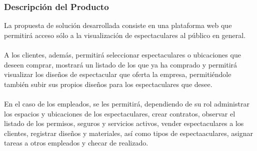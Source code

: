 \subsubsection{Descripción del Producto}
La propuesta de solución desarrollada consiste en una plataforma web que permitirá acceso sólo a la visualización de espectaculares al público en general.\\ \\
A los clientes, además, permitirá seleccionar espectaculares o ubicaciones que deseen comprar, mostrará un listado de los que ya ha comprado y permitirá visualizar los diseños de espectacular que oferta la empresa, permitiéndole también subir sus propios diseños para los espectaculares que desee.\\ \\
En el caso de los empleados, se les permitirá, dependiendo de su rol administrar los espacios y ubicaciones de los espectaculares, crear contratos, observar el listado de los permisos, seguros y servicios activos, vender espectaculares a los clientes, registrar diseños y materiales, así como tipos de espectaaculares, asignar tareas a otros empleados y checar de realizado.